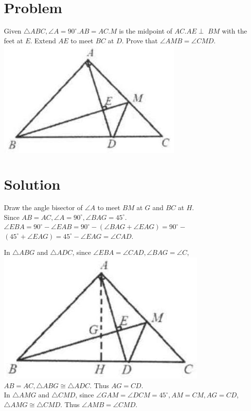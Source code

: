 \documentclass{article}
\begin{document}
\section*{Problem}
Given \(\triangle A B C, \angle A=90^{\circ} . A B=A C . M\) is the midpoint of \(A C . A E \perp\) \(B M\) with the feet at \(E\). Extend \(A E\) to meet \(B C\) at \(D\). Prove that \(\angle A M B=\angle C M D\).\\
\centering
\includegraphics[width=\textwidth]{images/066(2).jpg}

\section*{Solution}
Draw the angle bisector of \(\angle A\) to meet \(B M\) at \(G\) and \(B C\) at \(H\).\\
Since \(A B=A C, \angle A=90^{\circ}, \angle B A G=45^{\circ}\).\\
\(\angle E B A=90^{\circ}-\angle E A B=90^{\circ}-(\angle B A G+\angle E A G)=90^{\circ}-\) \(\left(45^{\circ}+\angle E A G\right)=45^{\circ}-\angle E A G=\angle C A D\).

In \(\triangle A B G\) and \(\triangle A D C\), since \(\angle E B A=\angle C A D, \angle B A G=\angle C\),\\
\includegraphics[width=\textwidth]{images/071.jpg} \(A B=A C, \triangle A B G \cong \triangle A D C\). Thus \(A G=C D\).\\
In \(\triangle A M G\) and \(\triangle C M D\), since \(\angle G A M=\angle D C M=45^{\circ}, A M=C M, A G=C D\), \(\triangle A M G \cong \triangle C M D\). Thus \(\angle A M B=\angle C M D\).
\end{document}
